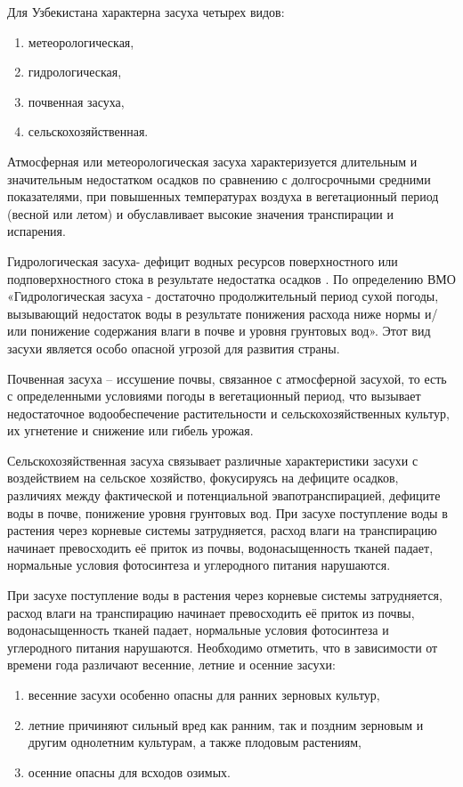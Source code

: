 Для Узбекистана характерна засуха четырех видов:
\begin{enumerate}
	\item метеорологическая,
	\item гидрологическая,
	\item почвенная засуха,
	\item сельскохозяйственная.
\end{enumerate}

Атмосферная или метеорологическая засуха характеризуется длительным и значительным недостатком осадков по сравнению с долгосрочными средними показателями, при повышенных температурах воздуха в вегетационный период (весной или летом) и обуславливает высокие значения транспирации и испарения.

Гидрологическая засуха- дефицит водных ресурсов поверхностного или подповерхностного стока в результате недостатка осадков \cite{Chub2001}. По определению ВМО «Гидрологическая засуха - достаточно продолжительный период сухой погоды, вызывающий недостаток воды в результате понижения расхода ниже нормы и/или понижение содержания влаги в почве и уровня грунтовых вод». Этот вид засухи является особо опасной угрозой для развития страны.

Почвенная засуха – иссушение почвы, связанное с атмосферной засухой, то есть с определенными условиями погоды в вегетационный период, что вызывает недостаточное водообеспечение растительности и сельскохозяйственных культур, их угнетение и снижение или гибель урожая. 

Сельскохозяйственная засуха связывает различные характеристики засухи с воздействием на сельское хозяйство, фокусируясь на дефиците осадков, различиях между фактической и потенциальной эвапотранспирацией, дефиците воды в почве, понижение уровня грунтовых вод.
При засухе поступление воды в растения через корневые системы затрудняется, расход влаги на транспирацию начинает превосходить её приток из почвы, водонасыщенность тканей падает, нормальные условия фотосинтеза и углеродного питания нарушаются.

При засухе поступление воды в растения через корневые системы затрудняется, расход влаги на транспирацию начинает превосходить её приток из почвы, водонасыщенность тканей падает, нормальные условия фотосинтеза и углеродного питания нарушаются.
Необходимо отметить, что в зависимости от времени года различают весенние, летние и осенние засухи: 
\begin{enumerate}
	\item весенние засухи особенно опасны для ранних зерновых культур,
	\item летние причиняют сильный вред как ранним, так и поздним зерновым и другим однолетним культурам, а также плодовым растениям,
	\item осенние опасны для всходов озимых.
\end{enumerate}

